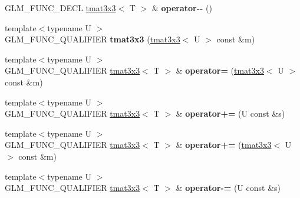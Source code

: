 \begin{DoxyCompactItemize}
\item 
\hypertarget{structglm_1_1detail_1_1tmat3x3_a85bb0e7a7e92c25903e544f0bc2b0578}{G\-L\-M\-\_\-\-F\-U\-N\-C\-\_\-\-D\-E\-C\-L \hyperlink{structglm_1_1detail_1_1tmat3x3}{tmat3x3}$<$ T $>$ \& {\bfseries operator-\/-\/} ()}\label{structglm_1_1detail_1_1tmat3x3_a85bb0e7a7e92c25903e544f0bc2b0578}

\item 
\hypertarget{structglm_1_1detail_1_1tmat3x3_ab691d7caf9061561191dd850583f5378}{{\footnotesize template$<$typename U $>$ }\\G\-L\-M\-\_\-\-F\-U\-N\-C\-\_\-\-Q\-U\-A\-L\-I\-F\-I\-E\-R {\bfseries tmat3x3} (\hyperlink{structglm_1_1detail_1_1tmat3x3}{tmat3x3}$<$ U $>$ const \&m)}\label{structglm_1_1detail_1_1tmat3x3_ab691d7caf9061561191dd850583f5378}

\item 
\hypertarget{structglm_1_1detail_1_1tmat3x3_aa6cc9ed7b043e1a0e875d53fae70b9cc}{{\footnotesize template$<$typename U $>$ }\\G\-L\-M\-\_\-\-F\-U\-N\-C\-\_\-\-Q\-U\-A\-L\-I\-F\-I\-E\-R \hyperlink{structglm_1_1detail_1_1tmat3x3}{tmat3x3}$<$ T $>$ \& {\bfseries operator=} (\hyperlink{structglm_1_1detail_1_1tmat3x3}{tmat3x3}$<$ U $>$ const \&m)}\label{structglm_1_1detail_1_1tmat3x3_aa6cc9ed7b043e1a0e875d53fae70b9cc}

\item 
\hypertarget{structglm_1_1detail_1_1tmat3x3_a6d63393cb6bfbbb178ea94c3f8e32a33}{{\footnotesize template$<$typename U $>$ }\\G\-L\-M\-\_\-\-F\-U\-N\-C\-\_\-\-Q\-U\-A\-L\-I\-F\-I\-E\-R \hyperlink{structglm_1_1detail_1_1tmat3x3}{tmat3x3}$<$ T $>$ \& {\bfseries operator+=} (U const \&s)}\label{structglm_1_1detail_1_1tmat3x3_a6d63393cb6bfbbb178ea94c3f8e32a33}

\item 
\hypertarget{structglm_1_1detail_1_1tmat3x3_a6a6a2f95ee79fb5d44be2302528f621d}{{\footnotesize template$<$typename U $>$ }\\G\-L\-M\-\_\-\-F\-U\-N\-C\-\_\-\-Q\-U\-A\-L\-I\-F\-I\-E\-R \hyperlink{structglm_1_1detail_1_1tmat3x3}{tmat3x3}$<$ T $>$ \& {\bfseries operator+=} (\hyperlink{structglm_1_1detail_1_1tmat3x3}{tmat3x3}$<$ U $>$ const \&m)}\label{structglm_1_1detail_1_1tmat3x3_a6a6a2f95ee79fb5d44be2302528f621d}

\item 
\hypertarget{structglm_1_1detail_1_1tmat3x3_a0eb0cfb073fa68a4d59d23c4ed753306}{{\footnotesize template$<$typename U $>$ }\\G\-L\-M\-\_\-\-F\-U\-N\-C\-\_\-\-Q\-U\-A\-L\-I\-F\-I\-E\-R \hyperlink{structglm_1_1detail_1_1tmat3x3}{tmat3x3}$<$ T $>$ \& {\bfseries operator-\/=} (U const \&s)}\label{structglm_1_1detail_1_1tmat3x3_a0eb0cfb073fa68a4d59d23c4ed753306}


\end{DoxyCompactItemize}
